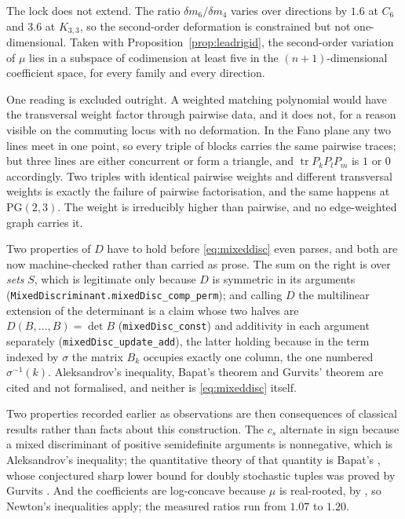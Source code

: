 \documentclass[11pt]{article}
\theoremstyle{remark}
\begin{document}
The lock does not extend. The ratio $\delta m_6/\delta m_4$ varies over directions by $1.6$ at $C_6$
and $3.6$ at $K_{3,3}$, so the second-order deformation is constrained but not one-dimensional. Taken
with Proposition~\ref{prop:leadrigid}, the second-order variation of $\mu$ lies in a subspace of
codimension at least five in the $(n+1)$-dimensional coefficient space, for every family and every
direction.

One reading is excluded outright. A weighted matching polynomial would have the transversal weight
factor through pairwise data, and it does not, for a reason visible on the commuting locus with no
deformation. In the Fano plane any two lines meet in one point, so every triple of blocks carries the
same pairwise traces; but three lines are either concurrent or form a triangle, and
$\operatorname{tr}P_kP_lP_m$ is $1$ or $0$ accordingly. Two triples with identical pairwise weights
and different transversal weights is exactly the failure of pairwise factorisation, and the same
happens at $\mathrm{PG}(2,3)$. The weight is irreducibly higher than pairwise, and no edge-weighted
graph carries it.

Two properties of $D$ have to hold before \eqref{eq:mixeddisc} even parses, and both are now
machine-checked rather than carried as prose. The sum on the right is over \emph{sets} $S$, which is
legitimate only because $D$ is symmetric in its arguments
(\texttt{MixedDiscriminant.mixedDisc\_comp\_perm}); and calling $D$ the multilinear extension of the
determinant is a claim whose two halves are $D(B,\dots,B)=\det B$
(\texttt{mixedDisc\_const}) and additivity in each argument separately
(\texttt{mixedDisc\_update\_add}), the latter holding because in the term indexed by $\sigma$ the
matrix $B_k$ occupies exactly one column, the one numbered $\sigma^{-1}(k)$. Aleksandrov's
inequality, Bapat's theorem and Gurvits' theorem are cited and not formalised, and neither is
\eqref{eq:mixeddisc} itself.

Two properties recorded earlier as observations are then consequences of classical results rather
than facts about this construction. The $c_s$ alternate in sign because a mixed discriminant of
positive semidefinite arguments is nonnegative, which is Aleksandrov's inequality; the
quantitative theory of that quantity is Bapat's \cite{Bapat}, whose conjectured sharp lower bound
for doubly stochastic tuples was proved by Gurvits \cite{Gurvits}. And the coefficients are
log-concave because $\mu$ is real-rooted, by \cite{MSS}, so Newton's inequalities apply; the
measured ratios run from $1.07$ to $1.20$.
\end{document}
